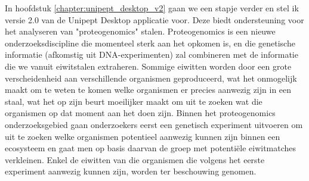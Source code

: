 In hoofdstuk \ref{chapter:unipept_desktop_v2} gaan we een stapje verder en stel ik versie 2.0 van de Unipept Desktop applicatie voor.
Deze biedt ondersteuning voor het analyseren van "proteogenomics" stalen.
Proteogenomics is een nieuwe onderzoeksdiscipline die momenteel sterk aan het opkomen is, en die genetische informatie (afkomstig uit DNA-experimenten) zal combineren met de informatie die we vanuit eiwitstalen extraheren.
Sommige eiwitten worden door een grote verscheidenheid aan verschillende organismen geproduceerd, wat het onmogelijk maakt om te weten te komen welke organismen er precies aanwezig zijn in een staal, wat het op zijn beurt moeilijker maakt om uit te zoeken wat die organismen op dat moment aan het doen zijn.
Binnen het proteogenomics onderzoeksgebied gaan onderzoekers eerst een genetisch experiment uitvoeren om uit te zoeken welke organismen potentieel aanwezig kunnen zijn binnen een ecosysteem en gaat men op basis daarvan de groep met potentiële eiwitmatches verkleinen.
Enkel de eiwitten van die organismen die volgens het eerste experiment aanwezig kunnen zijn, worden ter beschouwing genomen.


